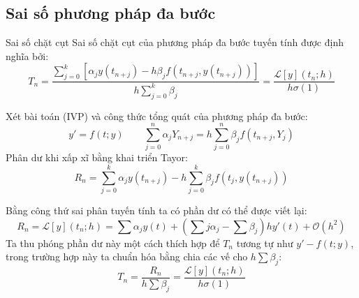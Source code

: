 \documentclass[aspectratio=43]{beamer}
\newcommand{\norm}[1]{\left\lVert #1 \right\rVert}
\begin{document}
\subsection*{Sai số phương pháp đa bước}
\begin{frame}
    \begin{baitapbox}{Sai số chặt cụt}
        Sai số chặt cụt của phương pháp đa bước tuyến tính được định nghĩa bởi:
        \[
        T_n = \frac{ \sum_{j=0}^{k} \left[ \alpha_j y(t_{n+j})  -h  \beta_j f(t_{n+j}, y(t_{n+j}))\right]}{h \sum_{j=0}^{k} \beta_j} = \frac{\mathcal{L}[y](t_n; h)}{h \sigma(1)}
        \]
    \end{baitapbox}
    Xét bài toán (IVP) và công thức tổng quát của phương pháp đa bước:
    \[
        y'=f(t;y) \qquad \sum_{j=0}^{n} \alpha_j Y_{n+j}  =h  \sum_{j=0}^{n}\beta_j f(t_{n+j}, Y_j)
    \]
    Phân dư khi xấp xĩ bằng khai triển Tayor:
    \[
        R_n = \sum_{j=0}^{k} \alpha_j y(t_{n+j})  -h  \sum_{j=0}^{k}\beta_j f(t_{j}, y(t_{n+j}))
    \]
\end{frame}

\begin{frame}
    Bằng công thứ sai phân tuyến tính ta có phần dư có thể được viết lại:
    \[
        R_n = \mathcal{L}[y](t_n; h) = \sum \alpha_j y(t) + \left(\sum j\alpha_j -\sum \beta_j\right) h y'(t) + \mathcal{O}({h^2})
    \]
        Ta thu phóng phần dư này một cách thích hợp để $T_n$ tương tự như $y'-f(t;y)$, trong trường hợp này ta chuẩn hóa bằng chia các vế cho $h\sum\beta_j$:
    \[
        T_n = \frac{R_n}{h\sum \beta_j} = \frac{\mathcal{L}[y](t_n; h)}{h\sigma(1)}
    \]
\end{frame}
\end{document}
